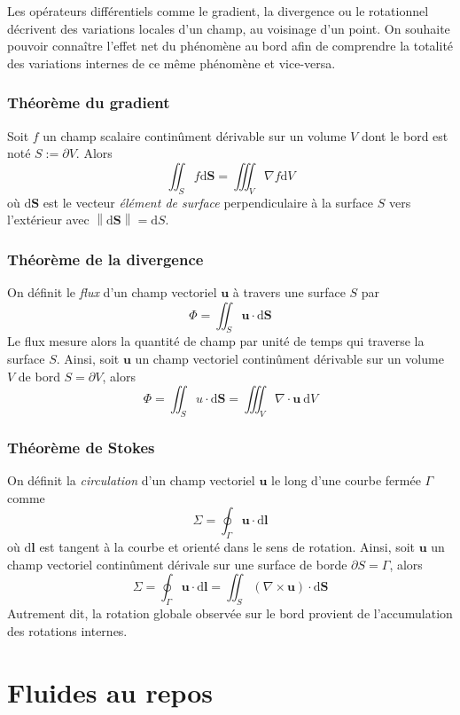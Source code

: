 \documentclass[10pt]{article}
\numberwithin{equation}{section}
\newcommand{\norme}[1]{ \left\| #1 \right\|}
\begin{document}
	Les opérateurs différentiels comme le gradient, la divergence ou le rotationnel décrivent des variations locales d'un champ, au voisinage d'un point. On souhaite pouvoir connaître l'effet net du phénomène au bord afin de comprendre la totalité des variations internes de ce même phénomène et vice-versa.
	
	\subsubsection*{Théorème du gradient}
	Soit $f$ un champ scalaire continûment dérivable sur un volume $V$ dont le bord est noté $S := \partial V$. Alors
	\[
	\boxed{\iint_S f \mathrm d \bm S = \iiint_V \nabla f \mathrm d V}
	\] 	
	où $\mathrm d \bm S$ est le vecteur \emph{élément de surface} perpendiculaire à la surface $S$ vers l'extérieur avec $\norme{\mathrm d \bm S} = \mathrm d S$.
	
	\subsubsection*{Théorème de la divergence}
	On définit le \emph{flux} d'un champ vectoriel $\bm u$ à travers une surface $S$ par 
	\[
	\Phi = \iint_S \bm u \cdot \mathrm d \bm S
	\]
	Le flux mesure alors la quantité de champ par unité de temps qui traverse la surface $S$. Ainsi, soit $\bm u$ un champ vectoriel continûment dérivable sur un volume $V$ de bord $S = \partial V$, alors
	\[
	\boxed{\Phi = \iint_S u \cdot \mathrm d \bm S = \iiint_V \nabla \cdot \bm u ~\mathrm d V}
	\]
	
	\subsubsection*{Théorème de Stokes}
	On définit la \emph{circulation} d'un champ vectoriel $\bm u$ le long d'une courbe fermée $\Gamma$ comme
	\[
	\Sigma = \oint_\Gamma \bm u \cdot \mathrm d \bm l
	\]
	où $\mathrm d \bm l$ est tangent à la courbe et orienté dans le sens de rotation. Ainsi, soit $\bm u$ un champ vectoriel continûment dérivale sur une surface de borde $\partial S = \Gamma$, alors
	\[
	\boxed{\Sigma = \oint_\Gamma \bm u \cdot \mathrm d \bm l = \iint_S \left(\nabla \times \bm u\right) \cdot \mathrm d \bm S}
	\]
	Autrement dit, la rotation globale observée sur le bord provient de l'accumulation des rotations internes.
	\clearpage
	\section{Fluides au repos}
\end{document}
